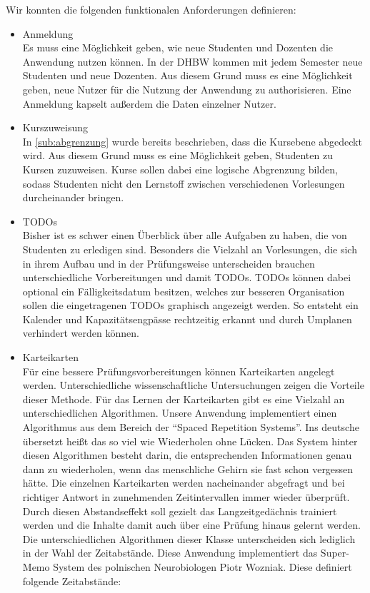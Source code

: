 Wir konnten die folgenden funktionalen Anforderungen definieren:
\begin{itemize}
    \item Anmeldung                         \\
        Es muss eine Möglichkeit geben, wie neue Studenten und Dozenten die Anwendung nutzen können.
        In der DHBW kommen mit jedem Semester neue Studenten und neue Dozenten.
        Aus diesem Grund muss es eine Möglichkeit geben, neue Nutzer für die Nutzung der Anwendung zu authorisieren.
        Eine Anmeldung kapselt außerdem die Daten einzelner Nutzer.
    \item Kurszuweisung                     \\
        In \autoref{sub:abgrenzung} wurde bereits beschrieben, dass die Kursebene abgedeckt wird.
        Aus diesem Grund muss es eine Möglichkeit geben, Studenten zu Kursen zuzuweisen.
        Kurse sollen dabei eine logische Abgrenzung bilden, sodass Studenten nicht den Lernstoff zwischen verschiedenen Vorlesungen durcheinander bringen.
    \item TODOs                             \\
        Bisher ist es schwer einen Überblick über alle Aufgaben zu haben, die von Studenten zu erledigen sind.
        Besonders die Vielzahl an Vorlesungen, die sich in ihrem Aufbau und in der Prüfungsweise unterscheiden brauchen unterschiedliche Vorbereitungen und damit TODOs.
        TODOs können dabei optional ein Fälligkeitsdatum besitzen, welches zur besseren Organisation sollen die eingetragenen TODOs graphisch angezeigt werden.
        So entsteht ein Kalender und Kapazitätsengpässe rechtzeitig erkannt und durch Umplanen verhindert werden können.
    \item Karteikarten                      \\
        Für eine bessere Prüfungsvorbereitungen können Karteikarten angelegt werden. Unterschiedliche wissenschaftliche Untersuchungen zeigen die Vorteile dieser Methode. Für das Lernen der Karteikarten gibt es eine Vielzahl an unterschiedlichen Algorithmen. Unsere Anwendung implementiert einen Algorithmus aus dem Bereich der \enquote{Spaced Repetition Systems}. Ins deutsche übersetzt heißt das so viel wie Wiederholen ohne Lücken. Das System hinter diesen Algorithmen besteht darin, die entsprechenden Informationen genau dann zu wiederholen, wenn das menschliche Gehirn sie fast schon vergessen hätte. Die einzelnen Karteikarten werden nacheinander abgefragt und bei richtiger Antwort in zunehmenden Zeitintervallen immer wieder überprüft. Durch diesen Abstandseffekt soll gezielt das Langzeitgedächnis trainiert werden und die Inhalte damit auch über eine Prüfung hinaus gelernt werden. Die unterschiedlichen Algorithmen dieser Klasse unterscheiden sich lediglich in der Wahl der Zeitabstände. Diese Anwendung implementiert das Super-Memo System des polnischen Neurobiologen Piotr Wozniak. Diese definiert folgende Zeitabstände:

\end{itemize}
